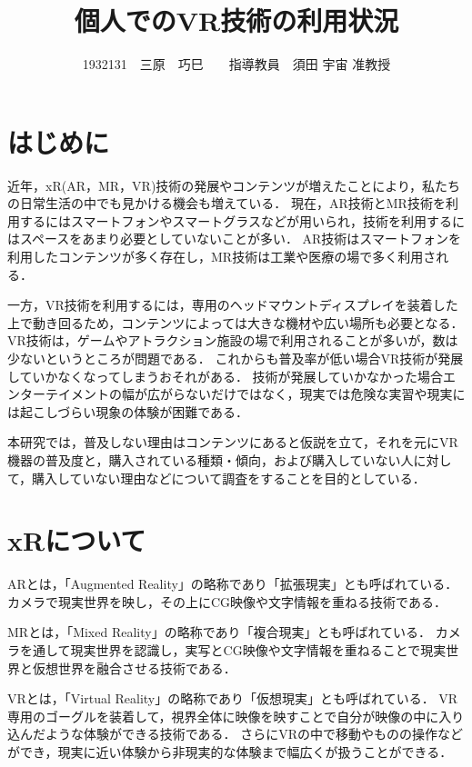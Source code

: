 \documentclass[twocolumn,10pt,a4j]{ltjsarticle}
\title{個人でのVR技術の利用状況}
\author{1932131　三原　巧巳　　指導教員　須田 宇宙 准教授}
\date{}
\begin{document}
\maketitle

\section{はじめに}
近年，xR(AR，MR，VR)技術の発展やコンテンツが増えたことにより，私たちの日常生活の中でも見かける機会も増えている．
現在，AR技術とMR技術を利用するにはスマートフォンやスマートグラスなどが用いられ，技術を利用するにはスペースをあまり必要としていないことが多い．
AR技術はスマートフォンを利用したコンテンツが多く存在し，MR技術は工業や医療の場で多く利用される．

一方，VR技術を利用するには，専用のヘッドマウントディスプレイを装着した上で動き回るため，コンテンツによっては大きな機材や広い場所も必要となる．
VR技術は，ゲームやアトラクション施設の場で利用されることが多いが，数は少ないというところが問題である．
これからも普及率が低い場合VR技術が発展していかなくなってしまうおそれがある．
技術が発展していかなかった場合エンターテイメントの幅が広がらないだけではなく，現実では危険な実習や現実には起こしづらい現象の体験が困難である．

本研究では，普及しない理由はコンテンツにあると仮説を立て，それを元にVR機器の普及度と，購入されている種類・傾向，および購入していない人に対して，購入していない理由などについて調査をすることを目的としている．

\section{xRについて}
ARとは，「Augmented Reality」の略称であり「拡張現実」とも呼ばれている．
カメラで現実世界を映し，その上にCG映像や文字情報を重ねる技術である．

MRとは，「Mixed Reality」の略称であり「複合現実」とも呼ばれている．
カメラを通して現実世界を認識し，実写とCG映像や文字情報を重ねることで現実世界と仮想世界を融合させる技術である．

VRとは，「Virtual Reality」の略称であり「仮想現実」とも呼ばれている．
VR専用のゴーグルを装着して，視界全体に映像を映すことで自分が映像の中に入り込んだような体験ができる技術である．
さらにVRの中で移動やものの操作などができ，現実に近い体験から非現実的な体験まで幅広くが扱うことができる．
\end{document}
